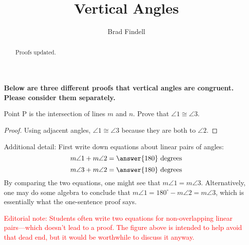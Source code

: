 \documentclass[nooutcomes]{ximera}
\title{Vertical Angles}
\author{Brad Findell}
\begin{document}
\begin{abstract}
Proofs updated.
\end{abstract}
\maketitle

\textbf{Below are three different proofs that vertical angles are congruent.  Please consider them separately.}

\begin{problem}
Point P is the intersection of lines $m$ and $n$.  Prove that $\angle 1\cong \angle 3$.  

\begin{image}
\end{image}

\begin{proof}
Using adjacent angles, $\angle 1\cong \angle 3$ because they are both  to $\angle 2$.
\end{proof}

\begin{problem}
Additional detail: First write down equations about linear pairs of angles: 
\[
m\angle 1 + m\angle 2 = \answer{180} \textrm{ degrees}
\]
\[
m\angle 3 + m\angle 2 = \answer{180} \textrm{ degrees}
\]
By comparing the two equations, one might see that $m\angle 1=m\angle 3$.   
Alternatively, one may do some algebra to conclude that $m\angle 1 = 180^\circ - m\angle 2 = m\angle 3$, which is essentially what the one-sentence proof says.

{\textcolor{red}{Editorial note: Students often write two equations for non-overlapping linear pairs---which doesn't lead to a proof.  The figure above is intended to help avoid that dead end, but it would be worthwhile to discuss it anyway.}}

\end{problem}

\end{problem}
\end{document}
